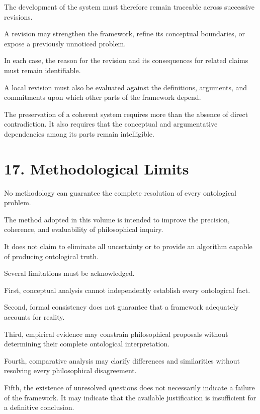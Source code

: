 The development of the system
must therefore remain traceable
across successive revisions.

A revision may strengthen
the framework, refine its
conceptual boundaries, or
expose a previously unnoticed
problem.

In each case, the reason
for the revision and its
consequences for related
claims must remain identifiable.

A local revision must also
be evaluated against the
definitions, arguments, and
commitments upon which other
parts of the framework depend.

The preservation of a coherent
system requires more than
the absence of direct contradiction.
It also requires that the
conceptual and argumentative
dependencies among its parts
remain intelligible.


\section*{17. Methodological Limits}

No methodology can guarantee
the complete resolution of
every ontological problem.

The method adopted in this
volume is intended to improve
the precision, coherence,
and evaluability of philosophical
inquiry.

It does not claim to eliminate
all uncertainty or to provide
an algorithm capable of
producing ontological truth.

Several limitations must
be acknowledged.

First, conceptual analysis
cannot independently establish
every ontological fact.

Second, formal consistency
does not guarantee that
a framework adequately
accounts for reality.

Third, empirical evidence
may constrain philosophical
proposals without determining
their complete ontological
interpretation.

Fourth, comparative analysis
may clarify differences and
similarities without resolving
every philosophical disagreement.

Fifth, the existence of
unresolved questions does
not necessarily indicate
a failure of the framework.
It may indicate that the
available justification is
insufficient for a definitive
conclusion.

